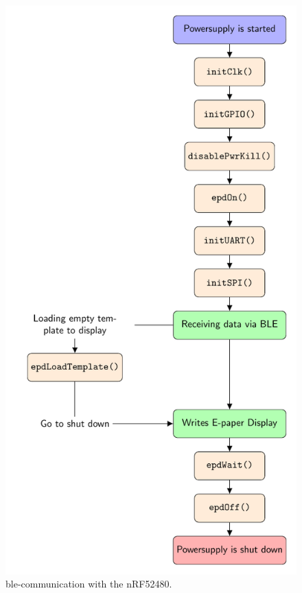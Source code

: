 \begin{figure}[ht]
	\centering
	\includegraphics[height=0.9\textheight]{4-development/software/graphics/main.pdf}
	\caption{\acs{ble}-communication with the nRF52480.\label{software:main}}
\end{figure}

